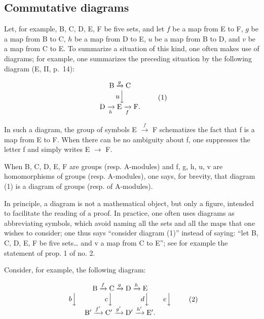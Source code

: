 \subsection{Commutative diagrams}

Let, for example, B, C, D, E, F be five sets, and let \(f\) be a map from E to F, \(g\) be a map from B to C, \(h\) be a map from D to E, \(u\) be a map from B to D, and \(v\) be a map from C to E. To summarize a situation of this kind, one often makes use of diagrams; for example, one summarizes the preceding situation by the following diagram (E, II, p.~14):

\[
\begin{array}{c} \mathrm{B} \xrightarrow {g} \mathrm{C} \\ u \Big \downarrow \\ \mathrm{D} \xrightarrow [ h ]{} \mathrm{E} \xrightarrow [ f ]{} \mathrm{F}. \end{array}\tag{1}
\]

In such a diagram, the group of symbols E \(\xrightarrow{f}\) F schematizes the fact that f is a map from E to F. When there can be no ambiguity about f, one suppresses the letter f and simply writes E \(\rightarrow\) F.

When B, C, D, E, F are groups (resp. A-modules) and f, g, h, u, v are homomorphisms of groups (resp. A-modules), one says, for brevity, that diagram (1) is a diagram of groups (resp. of A-modules).

In principle, a diagram is not a mathematical object, but only a figure, intended to facilitate the reading of a proof. In practice, one often uses diagrams as abbreviating symbols, which avoid naming all the sets and all the maps that one wishes to consider; one thus says “consider diagram (1)” instead of saying: “let B, C, D, E, F be five sets\ldots{} and v a map from C to E”; see for example the statement of prop. 1 of no. 2.

Consider, for example, the following diagram:

\[
\begin{array}{c} \mathrm{B} \xrightarrow {f} \mathrm{C} \xrightarrow {g} \mathrm{D} \xrightarrow {h} \mathrm{E} \\ b \Big \downarrow \qquad \qquad c \Big \downarrow \qquad \qquad d \Big \downarrow \qquad e \Big \downarrow \\ \mathrm{B} ^ {\prime} \xrightarrow {f ^ {\prime}} \mathrm{C} ^ {\prime} \xrightarrow {g ^ {\prime}} \mathrm{D} ^ {\prime} \xrightarrow {h ^ {\prime}} \mathrm{E} ^ {\prime}. \end{array}\tag{2}
\]

